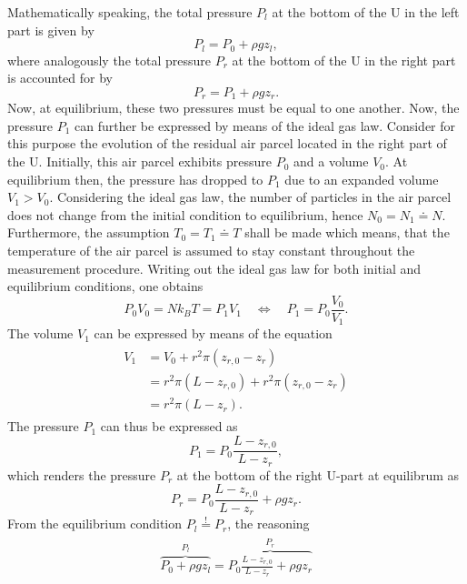\documentclass[a4paper,11pt, twocolumn]{article}
\begin{document}
Mathematically speaking, the total pressure $P_l$ at the bottom of the U in the left part is given by \begin{equation}
	P_l = P_0 + \rho g z_l,
\end{equation} where analogously the total pressure $P_r$ at the bottom of the U in the right part is accounted for by \begin{equation}
P_r = P_1 + \rho g z_r.
\end{equation}
Now, at equilibrium, these two pressures must be equal to one another. Now, the pressure $P_1$ can further be expressed by means of the ideal gas law. Consider for this purpose the evolution of the residual air parcel located in the right part of the U. Initially, this air parcel exhibits pressure $P_0$ and a volume $V_0$. At equilibrium then, the pressure has dropped to $P_1$ due to an expanded volume $V_1 > V_0$. Considering the ideal gas law, the number of particles in the air parcel does not change from the initial condition to equilibrium, hence $N_0 = N_1 \doteq N$. Furthermore, the assumption $T_0 = T_1 \doteq T$ shall be made which means, that the temperature of the air parcel is assumed to stay constant throughout the measurement procedure. Writing out the ideal gas law for both initial and equilibrium conditions, one obtains \begin{equation}
	P_0V_0 = Nk_BT = P_1V_1 \quad \Leftrightarrow \quad P_1 = P_0\frac{V_0}{V_1}.
\end{equation} The volume $V_1$ can be expressed by means of the equation \begin{align}\begin{aligned}
V_1 &= V_0 + r^2\pi(z_{r,0}-z_r) \\ &= r^2\pi(L-z_{r,0})+r^2\pi(z_{r,0}-z_r) \\
&= r^2\pi (L-z_r).
\end{aligned}\end{align} The pressure $P_1$ can thus be expressed as \begin{equation}
P_1 = P_0 \frac{L-z_{r,0}}{L-z_{r}},
\end{equation} which renders the pressure $P_r$ at the bottom of the right U-part at equilibrum as \begin{equation}
P_r = P_0 \frac{L-z_{r,0}}{L-z_{r}} + \rho gz_r.
\end{equation} From the equilibrium condition $P_l \overset{!}{=} P_r$, the reasoning \begin{gather}
\begin{gathered}
	\overbrace{P_0 + \rho g z_l}^{P_l} = \overbrace{P_0 \frac{L-z_{r,0}}{L-z_{r}} + \rho gz_r}^{P_r} \\

\end{gathered}
\end{gather}
\end{document}
